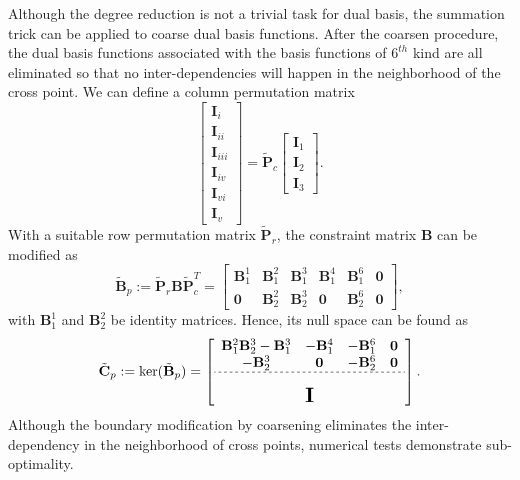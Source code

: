 \documentclass[preprint,12pt]{elsarticle}
\theoremstyle{remark}
\begin{document}
Although the degree reduction is not a trivial task for dual basis, the summation trick can be applied to coarse dual basis functions. After the coarsen procedure, the dual basis functions associated with the basis functions of $6^{th}$ kind are all eliminated so that no inter-dependencies will happen in the neighborhood of the cross point. We can define a column permutation matrix 
\begin{equation}
    \begin{bmatrix}
        \mathbf{I}_{i}\\
        \mathbf{I}_{ii}\\
        \mathbf{I}_{iii}\\
        \mathbf{I}_{iv}\\
        \mathbf{I}_{vi}\\
        \mathbf{I}_{v}
    \end{bmatrix}=
    \tilde{\mathbf{P}}_c
    \begin{bmatrix}
        \mathbf{I}_1\\
        \mathbf{I}_2\\
        \mathbf{I}_3
    \end{bmatrix}.
\end{equation}
With a suitable row permutation matrix $\tilde{\mathbf{P}}_r$, the constraint matrix $\mathbf{B}$ can be modified as
\begin{equation}
    \tilde{\mathbf{B}}_p:=\tilde{\mathbf{P}}_r\mathbf{B}\tilde{\mathbf{P}}_c^T=
    \begin{bmatrix}
        \mathbf{B}_1^1 & \mathbf{B}_1^2 & \mathbf{B}_1^3 & \mathbf{B}_1^4 & \mathbf{B}_1^6 & \mathbf{0} \\
        \mathbf{0} & \mathbf{B}_2^2 & \mathbf{B}_2^3 & \mathbf{0} & \mathbf{B}_2^6 & \mathbf{0}
    \end{bmatrix},
\end{equation}
with $\mathbf{B}_1^1$ and $\mathbf{B}_2^2$ be identity matrices. Hence, its null space can be found as
\begin{equation}
    \tilde{\mathbf{C}}_p:=\ker(\tilde{\mathbf{B}}_p)=
    \left[\begin{array}{cccc}
      \mathbf{B}_1^2\mathbf{B}_2^3-\mathbf{B}_1^3 & -\mathbf{B}_1^4 & -\mathbf{B}_1^6 & \mathbf{0} \\ 
      -\mathbf{B}_2^3 & \mathbf{0} & -\mathbf{B}_2^6 & \mathbf{0} \\ \hdashline[2pt/2pt]
       \multicolumn{4}{c}{\multirow{3}{*}{\raisebox{0mm}{\scalebox{1.5}{$\mathbf{I}$}}}}\\
       & & & 
    \end{array}\right].
\end{equation}
Although the boundary modification by coarsening eliminates the inter-dependency in the neighborhood of cross points, numerical tests demonstrate sub-optimality.  
\end{document}
